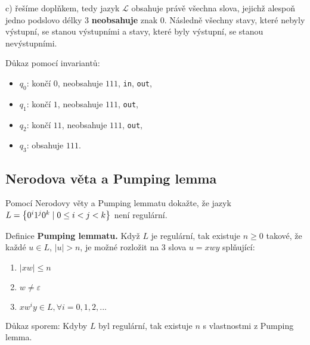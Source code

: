 c) řešíme doplňkem, tedy jazyk $\mathcal{L}$ obsahuje právě všechna slova, jejichž alespoň jedno podslovo délky $3$ 
\textbf{neobsahuje} znak $0$. Následně všechny stavy, které nebyly výstupní, se stanou výstupními a stavy, které byly 
výstupní, se stanou nevýstupními.


Důkaz pomocí invariantů:
\begin{itemize}[noitemsep]
    \item $q_0$: končí $0$, neobsahuje $111$, \texttt{in}, \texttt{out},
    \item $q_1$: končí $1$, neobsahuje $111$, \texttt{out},
    \item $q_2$: končí $11$, neobsahuje $111$, \texttt{out},
    \item $q_3$: obsahuje $111$.
\end{itemize}

\newpage

\subsection{Nerodova věta a Pumping lemma}
Pomocí Nerodovy věty a Pumping lemmatu dokažte, že jazyk $L = \left\lbrace 0^i 1^j 0^k \mid 0 \leq i < j <k \right\rbrace$ není regulární.

Definice \textbf{Pumping lemmatu.} Když $L$ je regulární, tak existuje $n \geq 0$ takové, že každé ${u \in L}$,
$|u| > n$, je možné rozložit na 3 slova $u = xwy$ splňující:

\begin{enumerate}[1), noitemsep]
    \item $|xw| \leq n$
    \item $w \not= \varepsilon$
    \item $xw^i y \in L, \forall i = 0, 1, 2, ...$
\end{enumerate}
Důkaz sporem:
Kdyby $L$ byl regulární, tak existuje $n$ s vlastnostmi z Pumping lemma.


